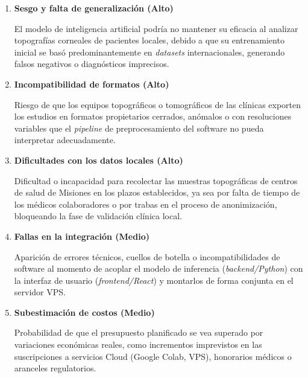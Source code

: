             \begin{enumerate}[label=\textbf{R\arabic* - }] 
            
                \item \textbf{Sesgo y falta de generalización (Alto)}
                
                    El modelo de inteligencia artificial podría no mantener su eficacia al analizar topografías corneales de pacientes locales, debido a que su entrenamiento inicial se basó predominantemente en \textit{datasets} internacionales, generando falsos negativos o diagnósticos imprecisos.
    
                \item \textbf{Incompatibilidad de formatos (Alto)}
                
                    Riesgo de que los equipos topográficos o tomográficos de las clínicas exporten los estudios en formatos propietarios cerrados, anómalos o con resoluciones variables que el \textit{pipeline} de preprocesamiento del software no pueda interpretar adecuadamente.
    
                \item \textbf{Dificultades con los datos locales (Alto)}
                
                    Dificultad o incapacidad para recolectar las muestras topográficas de centros de salud de Misiones en los plazos establecidos, ya sea por falta de tiempo de los médicos colaboradores o por trabas en el proceso de anonimización, bloqueando la fase de validación clínica local.
    
                \item \textbf{Fallas en la integración (Medio)}
                
                   Aparición de errores técnicos, cuellos de botella o incompatibilidades de software al momento de acoplar el modelo de inferencia (\textit{backend/Python}) con la interfaz de usuario (\textit{frontend/React}) y montarlos de forma conjunta en el servidor VPS.
    
                \item \textbf{Subestimación de costos (Medio)}
                
                   Probabilidad de que el presupuesto planificado se vea superado por variaciones económicas reales, como incrementos imprevistos en las suscripciones a servicios Cloud (Google Colab, VPS), honorarios médicos o     aranceles regulatorios.
    

\end{enumerate}
